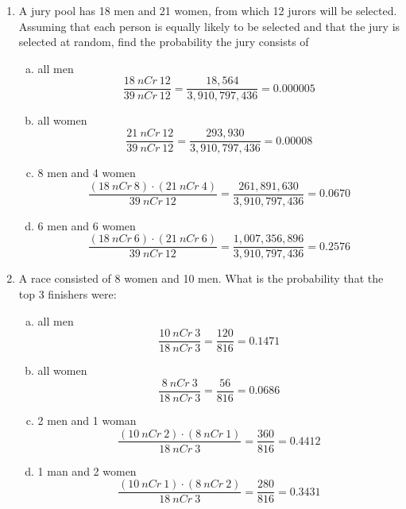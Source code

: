 \begin{enumerate}
\item A jury pool has 18 men and 21 women, from which 12 jurors will be selected. Assuming that
each person is equally likely to be selected and that the jury is selected at random, find the
probability the jury consists of
\begin{enumerate}[(a)]
\item all men 
\[\dfrac{18\ nCr\ 12}{39\ nCr\ 12} = \dfrac{18,564}{3,910,797,436} = 0.000005\]
\item all women 
\[\dfrac{21\ nCr\ 12}{39\ nCr\ 12} = \dfrac{293,930}{3,910,797,436} = 0.00008\]
\item 8 men and 4 women 
\[\dfrac{(18\ nCr\ 8) \cdot (21\ nCr\ 4)}{39\ nCr\ 12} = \dfrac{261,891,630}{3,910,797,436} = 0.0670\]
\item 6 men and 6 women 
\[\dfrac{(18\ nCr\ 6) \cdot (21\ nCr\ 6)}{39\ nCr\ 12} = \dfrac{1,007,356,896}{3,910,797,436} = 0.2576\]
\end{enumerate}

\item A race consisted of 8 women and 10 men. What is the probability that the top 3
finishers were:
\begin{enumerate}[(a)]
\item all men 
\[\dfrac{10\ nCr\ 3}{18\ nCr\ 3} = \dfrac{120}{816} = 0.1471\]
\item all women 
\[\dfrac{8\ nCr\ 3}{18\ nCr\ 3} = \dfrac{56}{816} = 0.0686\]
\item 2 men and 1 woman 
\[\dfrac{(10\ nCr\ 2) \cdot (8\ nCr\ 1)}{18\ nCr\ 3} = \dfrac{360}{816} = 0.4412\]
\item 1 man and 2 women 
\[\dfrac{(10\ nCr\ 1) \cdot (8\ nCr\ 2)}{18\ nCr\ 3} = \dfrac{280}{816} = 0.3431\]
\end{enumerate}
\end{enumerate}